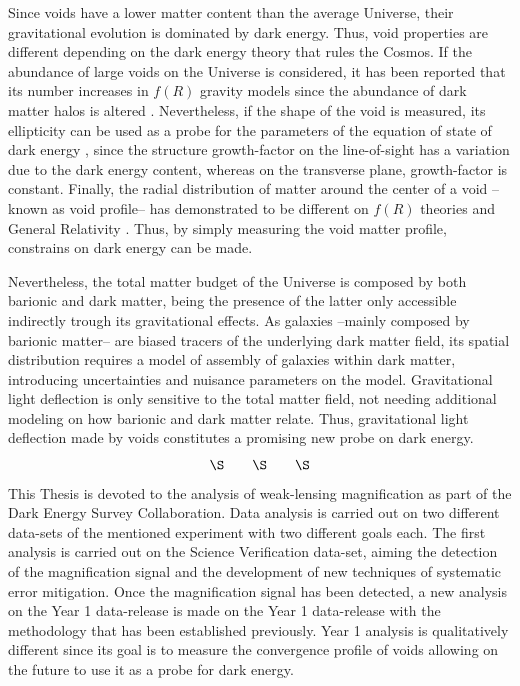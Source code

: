 Since voids have a lower matter content than the average Universe, their gravitational evolution is dominated by dark energy. Thus, void properties are different depending on the dark energy theory that rules the Cosmos. If the abundance of large voids on the Universe is considered, it has been reported that its number increases in $f(R)$ gravity models \cite{2012MNRAS.421.3481L} since the abundance of dark matter halos is altered \cite{2017JCAP...03..012V}. Nevertheless, if the shape of the void is measured, its ellipticity can be used as a probe for the parameters of the equation of state of dark energy \cite{2010MNRAS.403.1392L,0004-637X-754-2-109,PhysRevLett.98.081301,2013PhRvL.111x1103S}, since the structure growth-factor on the line-of-sight has a variation due to
the dark energy content, whereas on the transverse plane, growth-factor is constant. Finally, the radial distribution of matter around the center of a void --known as void profile-- has demonstrated to be different on $f(R)$ theories and General Relativity \cite{2014APh....54...44A,2014arXiv1410.8355C,2015MNRAS.451.4215Z,2015JCAP...08..028B,2016PhRvD..93j3522A,2016PhRvD..94j3524A}. Thus, by simply measuring the void matter profile, constrains on dark energy can be made.
\newline

Nevertheless, the total matter budget of the Universe is composed by both barionic and dark matter, being the presence of the latter only accessible indirectly trough its gravitational effects. As galaxies --mainly composed by barionic matter-- are biased tracers of the underlying dark matter field, its spatial distribution requires a model of assembly of galaxies within dark matter, introducing uncertainties and nuisance parameters on the model. Gravitational light deflection is only sensitive to the total matter field, not needing additional modeling on how barionic and dark matter relate. Thus, gravitational light deflection made by voids constitutes a promising new probe on dark energy.
$$\S\qquad \S\qquad \S$$
This Thesis is devoted to the analysis of weak-lensing magnification as part of the Dark Energy Survey Collaboration. Data analysis is carried out on two different data-sets of the mentioned experiment with two different goals each. The first analysis is carried out on the Science Verification data-set, aiming the detection of the magnification signal and the development of new techniques of systematic error mitigation. Once the magnification signal has been detected, a new analysis on the Year 1 data-release is made on the Year 1 data-release with the methodology that has been established previously. Year 1 analysis is qualitatively different since its goal is to measure the convergence profile of voids allowing on the future to use it as a probe for dark energy.
\newline

